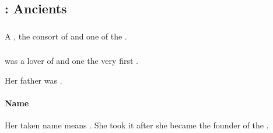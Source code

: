 
\part{\Ophidians}























\chapter{\Dragons: Ancients}















\section{\ApepNesthra}
\index{\ApepNesthra}
A \dragon, the consort of \Tiamat{} and one of the \firstgendragons. 















\section[Tyarith Xzai-Rasshana]{\TyarithXserasshana}
\index{\TyarithXserasshana}
\TyarithXserasshana{} was a lover of \Sethicus and one the very first \dragons. 

Her father was . 







\subsection{Name}
Her taken name \quo{\Kserasshana} means . 
She took it after she became the founder of the \dzraicchenosses. 

